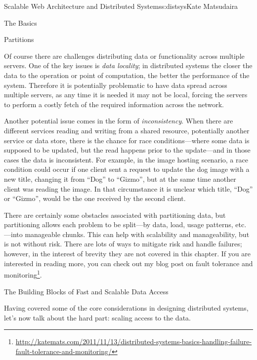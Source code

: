 \begin{aosachapter}{Scalable Web Architecture and Distributed Systems}{s:distsys}{Kate Matsudaira}
\begin{aosasect1}{The Basics}
\begin{aosasect2}{Partitions}

Of course there are challenges distributing data or functionality
across multiple servers. One of the key issues is \emph{data
locality}; in distributed systems the closer the data to the
operation or point of computation, the better the performance of the
system. Therefore it is potentially problematic to have data
spread across multiple servers, as any time it is needed it may not be
local, forcing the servers to perform a costly fetch of the required
information across the network.

Another potential issue comes in the form of
\emph{inconsistency}. When there are different services reading and
writing from a shared resource, potentially another service or data
store, there is the chance for race conditions---where some data is 
supposed to be updated, but the read happens prior to the update---and
in those cases the data is inconsistent. For example, in the image
hosting scenario, a race condition could occur if one client sent a
request to update the dog image with a new title, changing it from
``Dog'' to ``Gizmo'', but at the same time another client was reading
the image. In that circumstance it is unclear which title, ``Dog'' or
``Gizmo'', would be the one received by the second client.

There are certainly some obstacles associated with partitioning data,
but partitioning allows each problem to be split---by data, load, usage
patterns, etc.---into manageable chunks. This can help with scalability
and manageability, but is not without risk.  
There are lots of ways to mitigate risk and handle failures; however,
in the interest of brevity they are not covered in this chapter. If
you are interested in reading more, you can check out my blog post
on fault tolerance and monitoring\footnote{\url{http://katemats.com/2011/11/13/distributed-systems-basics-handling-failure-fault-tolerance-and-monitoring/}}.

\end{aosasect2}

\end{aosasect1}

\begin{aosasect1}{The Building Blocks of Fast and Scalable Data Access}

Having covered some of the core considerations in designing
distributed systems, let's now talk about the hard part: scaling
access to the data.


\end{aosasect1}
\end{aosachapter}
